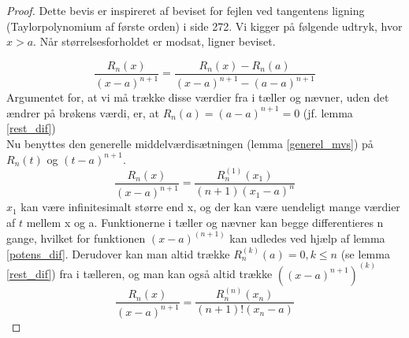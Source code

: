 \begin{proof}

Dette bevis er inspireret af beviset for fejlen ved tangentens ligning (Taylorpolynomium af første orden) i \cite{calc_et} side 272. Vi kigger på følgende udtryk, hvor $x>a$. Når størrelsesforholdet er modsat, ligner beviset.

\begin{equation}
	\frac{R_n(x)}{(x-a)^{n+1}}=\frac{R_n(x)-R_n(a)}{(x-a)^{n+1}-(a-a)^{n+1}}
\end{equation}
	Argumentet for, at vi må trække disse værdier fra i tæller og nævner, uden det ændrer på brøkens værdi, er, at $R_n(a)=(a-a)^{n+1}=0$ (jf. lemma \ref{rest_dif}) \\
Nu benyttes den generelle middelværdisætningen (lemma \ref{generel_mvs}) på $R_n(t)$ og $(t-a)^{n+1}$.
\begin{equation}
	\frac{R_n(x)}{(x-a)^{n+1}}=\frac{R_n^{(1)}(x_1)}{(n+1)(x_1-a)^{n}}
\end{equation}
$x_1$ kan være infinitesimalt større end x, og der kan være uendeligt mange værdier af $t$ mellem x og a. Funktionerne i tæller og nævner kan begge differentieres n gange, hvilket for funktionen $(x-a)^{(n+1)}$ kan udledes ved hjælp af lemma \ref{potens_dif}. Derudover kan man altid trække $R_n^{(k)}(a)=0, k \leq n$ (se lemma \ref{rest_dif}) fra i tælleren, og man kan også altid trække $((x-a)^{n+1})^{(k)}$
\begin{equation}
	\frac{R_n(x)}{(x-a)^{n+1}}=\frac{R_n^{(n)}(x_n)}{(n+1)!(x_n-a)}
\end{equation}

\end{proof}